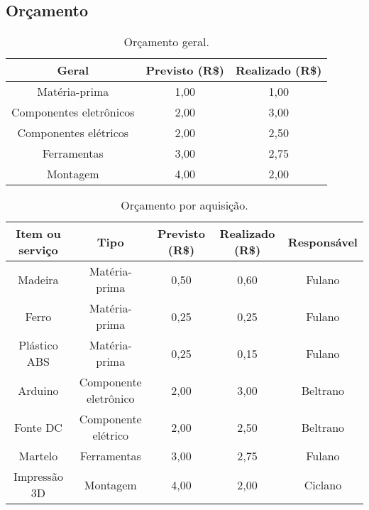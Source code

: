 \begin{landscape}

\chapter{Orçamento}

\begin{table}[htpb]
\begin{center}
\caption{Orçamento geral.}
\begin{tabular}{|c|c|c|}
\hline
\textbf{Geral}          & \textbf{Previsto (R\$)} & \textbf{Realizado (R\$)} \\ \hline
Matéria-prima           & 1,00                    & 1,00                     \\ \hline
Componentes eletrônicos & 2,00                    & 3,00                     \\ \hline
Componentes elétricos   & 2,00                    & 2,50                     \\ \hline
Ferramentas             & 3,00                    & 2,75                     \\ \hline
Montagem                & 4,00                    & 2,00                     \\ \hline
\end{tabular}
\end{center}
\end{table}

\begin{table}[htpb]
\begin{center}
\caption{Orçamento por aquisição.}
\begin{tabular}{|c|c|c|c|c|}
\hline
\textbf{Item ou serviço} & \textbf{Tipo} & \textbf{Previsto (R\$)} & \textbf{Realizado (R\$)} & \textbf{Responsável} \\ \hline
Madeira      & Matéria-prima & 0,50   & 0,60 & Fulano                    \\ \hline
Ferro        & Matéria-prima & 0,25   & 0,25 & Fulano                    \\ \hline
Plástico ABS & Matéria-prima & 0,25   & 0,15 & Fulano                    \\ \hline
Arduino      & Componente eletrônico & 2,00  & 3,00 & Beltrano                     \\ \hline
Fonte DC     & Componente elétrico & 2,00   & 2,50 & Beltrano                     \\ \hline
Martelo & Ferramentas & 3,00   & 2,75 & Fulano                     \\ \hline
Impressão 3D & Montagem & 4,00   & 2,00 & Ciclano                   \\ \hline
\end{tabular}
\end{center}
\end{table}


\end{landscape}
